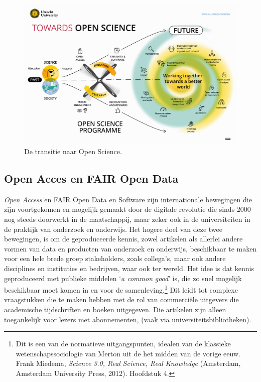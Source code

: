 \documentclass[smallauthor, chapterhaspagenum, nochapterinheader, pagenuminheader,  bigchapnum,medium2, tocpages,  garamond, titleinheader]{jote-book}
\begin{document}
	\begin{figure}
		\includegraphics[width=\linewidth]{media/image1.png}



		\label{fig:rId12}



		\caption{De transitie naar Open Science.}
	\end{figure}



	\subsection{Open Acces en FAIR Open Data}



	\emph{Open Access} en FAIR Open Data en Software zijn internationale bewegingen die zijn voortgekomen en mogelijk gemaakt door de digitale revolutie die sinds 2000 nog steeds doorwerkt in de maatschappij, maar zeker ook in de universiteiten in de praktijk van onderzoek en onderwijs. Het hogere doel van deze twee bewegingen, is om de geproduceerde kennis, zowel artikelen als allerlei andere vormen van data en producten van onderzoek en onderwijs, beschikbaar te maken voor een hele brede groep stakeholders, zoals collega's, maar ook andere disciplines en instituties en bedrijven, waar ook ter wereld. Het idee is dat kennis geproduceerd met publieke middelen ‘\emph{a common }\emph{good}' is, die zo snel mogelijk beschikbaar moet komen in en voor de samenleving.\footnote{Dit is een van de normatieve uitgangspunten, idealen van de klassieke wetenschapssociologie van Merton uit de het midden van de vorige eeuw. Frank Miedema, \emph{Science}\emph{ 3.0, Real }\emph{Science}\emph{, Real}\emph{ }\emph{Knowledge}\emph{ }(Amsterdam, Amsterdam University Press, 2012). Hoofdstuk 4.} Dit leidt tot complexe vraagstukken die te maken hebben met de rol van commerciële uitgevers die academische tijdschriften en boeken uitgegeven. Die artikelen zijn alleen toegankelijk voor lezers met abonnementen, (vaak via universiteitsbibliotheken).
\end{document}
